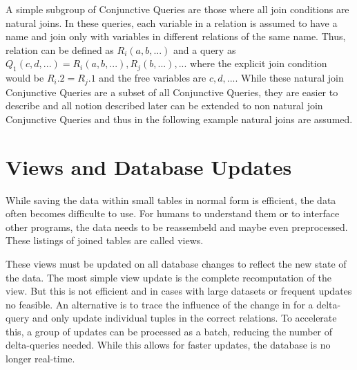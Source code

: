 \documentclass[abstracton,12pt]{scrreprt}
\begin{document}
A simple subgroup of Conjunctive Queries are those where all join conditions are natural joins. In these queries, each variable in a relation is assumed to have a name and join only with variables in different relations of the same name. Thus, relation can be defined as $R_i(a,b, ...)$ and a query as $Q_1(c,d,...) =R_i(a, b, ...), R_j(b, ...), ...$ where the explicit join condition would be $R_i.2 = R_j.1$ and the free variables are $c,d,...$. While these natural join Conjunctive Queries are a subset of all Conjunctive Queries, they are easier to describe and all notion described later can be extended to non natural join Conjunctive Queries and thus in the following example natural joins are assumed.

\section{Views and Database Updates}
While saving the data within small tables in normal form is efficient, the data often becomes difficulte to use. For humans to understand them or to interface other programs, the data needs to be reassembeld and maybe even preprocessed. These listings of joined tables are called views. 

These views must be updated on all database changes to reflect the new state of the data. The most simple view update is the complete recomputation of the view. But this is not efficient and in cases with large datasets or frequent updates no feasible. An alternative is to trace the influence of the change in for a delta-query and only update individual tuples in the correct relations. To accelerate this, a group of updates can be processed as a batch, reducing the number of delta-queries needed. While this allows for faster updates, the database is no longer real-time.
\end{document}
